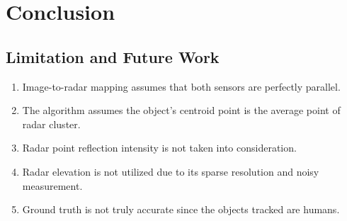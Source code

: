
\chapter{Conclusion}\label{chap:conclusion}


\section{Limitation and Future Work}
\begin{enumerate}
    \item Image-to-radar mapping assumes that both sensors are perfectly parallel.
    \item The algorithm assumes the object's centroid point is the average point of radar cluster.
    \item Radar point reflection intensity is not taken into consideration.
    \item Radar elevation is not utilized due to its sparse resolution and noisy measurement.
    \item Ground truth is not truly accurate since the objects tracked are humans.
\end{enumerate}
